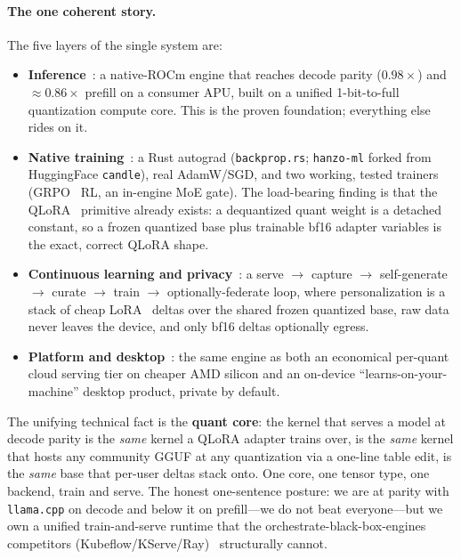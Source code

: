 \documentclass[11pt]{article}
\begin{document}
\paragraph{The one coherent story.} The five layers of the single system are:
\begin{itemize}
\item \textbf{Inference}~\cite{hanzo-rocm}: a native-ROCm engine that reaches decode parity ($0.98\times$) and $\approx 0.86\times$ prefill on a consumer APU, built on a unified 1-bit-to-full quantization compute core. This is the proven foundation; everything else rides on it.
\item \textbf{Native training}~\cite{hanzo-train}: a Rust autograd (\texttt{backprop.rs}; \texttt{hanzo-ml} forked from HuggingFace \texttt{candle}), real AdamW/SGD, and two working, tested trainers (GRPO~\cite{grpo} RL, an in-engine MoE gate). The load-bearing finding is that the QLoRA~\cite{qlora} primitive already exists: a dequantized quant weight is a detached constant, so a frozen quantized base plus trainable bf16 adapter variables is the exact, correct QLoRA shape.
\item \textbf{Continuous learning and privacy}~\cite{hanzo-clp}: a serve $\to$ capture $\to$ self-generate $\to$ curate $\to$ train $\to$ optionally-federate loop, where personalization is a stack of cheap LoRA~\cite{lora} deltas over the shared frozen quantized base, raw data never leaves the device, and only bf16 deltas optionally egress.
\item \textbf{Platform and desktop}~\cite{hanzo-platform}: the same engine as both an economical per-quant cloud serving tier on cheaper AMD silicon and an on-device ``learns-on-your-machine'' desktop product, private by default.
\end{itemize}

The unifying technical fact is the \textbf{quant core}: the kernel that serves a model at decode parity is the \emph{same} kernel a QLoRA adapter trains over, is the \emph{same} kernel that hosts any community GGUF at any quantization via a one-line table edit, is the \emph{same} base that per-user deltas stack onto. One core, one tensor type, one backend, train and serve. The honest one-sentence posture: we are at parity with \texttt{llama.cpp} on decode and below it on prefill---we do not beat everyone---but we own a unified train-and-serve runtime that the orchestrate-black-box-engines competitors (Kubeflow/KServe/Ray)~\cite{kubeflow,kserve,ray} structurally cannot.
\end{document}
